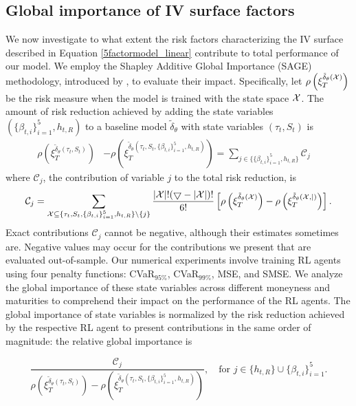 \documentclass[12pt]{article}
\begin{document}
\subsection{Global importance of IV surface factors}\label{sub:global_inportance}

We now investigate to what extent the risk factors characterizing the IV surface described in Equation \eqref{5factormodel_linear} contribute to total performance of our model. 
We employ the Shapley Additive Global Importance (SAGE) methodology, introduced by \cite{covert2020understanding}, to evaluate their impact. 
Specifically, let $\rho\left(\xi_{T}^{\tilde{\delta}_{\theta}(\cal{X})}\right)$ be the risk measure when the model is trained with the state space $\cal{X}$. The amount of risk reduction achieved by adding the state variables $(\{\beta_{t,i}\}^5_{i=1}, h_{t,R})$ to a baseline model \(\tilde{\delta}_{\theta}\) with state variables $(\tau_{t}, S_{t})$ is
\begin{align*}
        \rho\left(\xi_{T}^{\tilde{\delta}_{\theta}(\tau_{t}, S_{t})}\right) 
        &- \rho\left(\xi_{T}^{\tilde{\delta}_{\theta}(\tau_{t}, S_{t}, \{\beta_{t,i}\}^5_{i=1}, h_{t,R})}\right)= \sum_{j \in \{\{\beta_{t,i}\}^5_{i=1}, h_{t,R} \}} \mathcal{C}_{j}\quad 
    \end{align*}
where $\mathcal{C}_{j}$, the contribution of variable $j$ to the total risk reduction, is
\begin{equation*}
    \mathcal{C}_{j}= \sum_{\mathcal{X} \subseteq \{ \tau_{t}, S_{t}, \{\beta_{t,i}\}^5_{i=1}, h_{t,R}\} \setminus \{j\}} \frac{|\cal{X}|! (5 - |\cal{X}|)!}{6!} \left[ \rho\left(\xi_{T}^{\tilde{\delta}_{\theta}(\cal{X})}\right) - \rho\left(\xi_{T}^{\tilde{\delta}_{\theta}(\cal{X}, j)}\right) \right].
\end{equation*}
Exact contributions $\mathcal{C}_{j}$ cannot be negative, although their estimates sometimes are. Negative values may occur for the contributions we present that are evaluated out-of-sample.
Our numerical experiments involve training RL agents using four penalty functions: CVaR\(_{95\%}\), CVaR\(_{99\%}\), MSE, and SMSE. We analyze the global importance of these state variables across different moneyness and maturities to comprehend their impact on the performance of the RL agents. The global importance of state variables is normalized by the risk reduction achieved by the respective RL agent to present contributions in the same order of magnitude: the relative global importance is

\begin{equation}\label{eq:relative_shap}
    \frac{\mathcal{C}_{j}}{\rho\left(\xi_{T}^{\tilde{\delta}_{\theta}(\tau_{t}, S_{t})}\right) 
    - \rho\left(\xi_{T}^{\tilde{\delta}_{\theta}(\tau_{t}, S_{t}, \{\beta_{t,i}\}^5_{i=1}, h_{t,R})}\right)},\quad \mbox{for } j \in \{h_{t,R}\}\cup \{\beta_{t,i}\}^5_{i=1}.
\end{equation}
\end{document}
